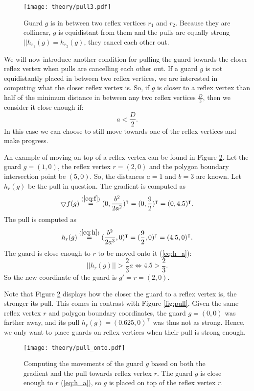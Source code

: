 \begin{figure}[h!]
    \centering
    \texttt{[image: theory/pull3.pdf]}
    \caption{Guard $g$ is in between two reflex vertices $r_1$ and $r_2$. Because they are collinear, $g$ is equidistant from them and the pulls are equally strong $||h_{r_1}(g) = h_{r_2}(g)$, they cancel each other out.}
    \label{fig:pull_cancel}
\end{figure}

We will now introduce another condition for pulling the guard towards the closer reflex vertex when pulls are cancelling each other out. If a guard $g$ is not equidistantly placed in between two reflex vertices, we are interested in computing what the closer reflex vertex is. So, if $g$ is closer to a reflex vertex than half of the minimum distance in between any two reflex vertices $\frac D 2$, then we consider it close enough if: $$a < \frac D 2.$$
In this case we can choose to still move towards one of the reflex vertices and make progress.

An example of moving on top of a reflex vertex can be found in Figure \ref{fig:pull_onto}. Let the guard $g = (1, 0)$, the reflex vertex $r = (2, 0)$ and the polygon boundary intersection point be $(5, 0)$. So, the distances $a = 1$ and $b = 3$ are known. Let $h_r(g)$ be the pull in question. The gradient is computed as
$$\bigtriangledown f(g) \overset{(\ref{eq:f})}{=} (0, \frac{b^2}{2a^2})^\intercal = (0, \frac{9}{2})^\intercal = (0, 4.5)^\intercal.$$
The pull is computed as 
$$h_r(g) \overset{(\ref{eq:h})}{=} (\frac{b^2}{2a^3}, 0)^\intercal = (\frac{9}{2}, 0)^\intercal = (4.5, 0)^\intercal.$$
The guard is close enough to $r$ to be moved onto it (\ref{eq:h_a}):
$$||h_r(g)|| > \frac 2 3 a \iff 4.5 > \frac 2 3.$$
So the new coordinate of the guard is $g' = r = (2, 0)$.

Note that Figure \ref{fig:pull_onto} displays how the closer the guard to a reflex vertex is, the stronger its pull. This comes in contrast with Figure \ref{fig:pull}. Given the same reflex vertex $r$ and polygon boundary coordinates, the guard $g = (0, 0)$ was farther away, and its pull $h_r(g) = (0.625, 0)^\intercal$ was thus not as strong. Hence, we only want to place guards on reflex vertices when their pull is strong enough.

\begin{figure}
    \centering
    \texttt{[image: theory/pull\_onto.pdf]}
    \caption{Computing the movements of the guard $g$ based on both the gradient and the pull towards reflex vertex $r$. The guard $g$ is close enough to $r$ (\ref{eq:h_a}), so $g$ is placed on top of the reflex vertex $r$.}
    \label{fig:pull_onto}
\end{figure}

